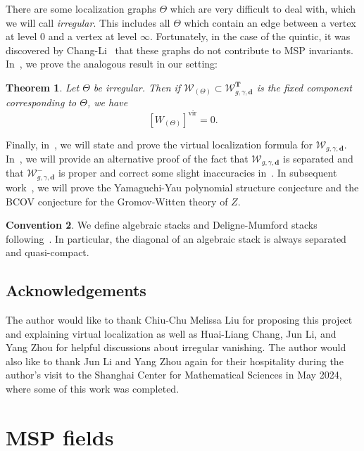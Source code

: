 \documentclass{amsart}
\newtheorem{thm}{Theorem}[section]
\theoremstyle{definition}
\newtheorem{conv}[thm]{Convention}
\theoremstyle{remark}
\theoremstyle{plain}
\theoremstyle{definition}
\theoremstyle{remark}
\newcommand{\T}{\mathbf{T}}
\newcommand{\bd}{\mathbf{d}}
\newcommand{\mc}[1]{\mathcal{#1}}
\newcommand{\mr}[1]{\mathrm{#1}}
\newcommand{\1}{\mathbf{1}}
\newcommand{\2}{\mathbf{2}}
\newcommand{\3}{\mathbf{3}}
\newcommand{\vir}{\mr{vir}}
\begin{document}
There are some localization graphs $\Theta$ which are very difficult to deal with, which we will call \textit{irregular}. This includes all $\Theta$ which contain an edge between a vertex at level $0$ and a vertex at level $\infty$. Fortunately, in the case of the quintic, it was discovered by Chang-Li~\cite{msp3} that these graphs do not contribute to MSP invariants. In~, we prove the analogous result in our setting:
\begin{thm}
    Let $\Theta$ be irregular. Then if $\mc{W}_{(\Theta)} \subset \mc{W}_{g,\gamma,\bd}^{\T}$ is the fixed component corresponding to $\Theta$, we have
    \[ [W_{(\Theta)}]^{\vir} = 0. \]
\end{thm}

Finally, in~, we will state and prove the virtual localization formula for $\mc{W}_{g,\gamma,\bd}$. In~, we will provide an alternative proof of the fact that $\mc{W}_{g,\gamma,\bd}$ is separated and that $\mc{W}_{g,\gamma,\bd}^-$ is proper and correct some slight inaccuracies in~\cite{mspfermat}.
In subsequent work~\cite{polynomiality,bcovme}, we will prove the Yamaguchi-Yau polynomial structure conjecture and the BCOV conjecture for the Gromov-Witten theory of $Z$.

\begin{conv}
We define algebraic stacks and Deligne-Mumford stacks following~\cite{champs}. In particular, the diagonal of an algebraic stack is always separated and quasi-compact.
\end{conv}


\subsection*{Acknowledgements}%
\label{sub:Acknowledgements}

The author would like to thank Chiu-Chu Melissa Liu for proposing this project and explaining virtual localization as well as Huai-Liang Chang, Jun Li, and Yang Zhou for helpful discussions about irregular vanishing. The author would also like to thank Jun Li and Yang Zhou again for their hospitality during the author's visit to the Shanghai Center for Mathematical Sciences in May 2024, where some of this work was completed.

\section{MSP fields}
\label{sec:nmsp}
\end{document}
